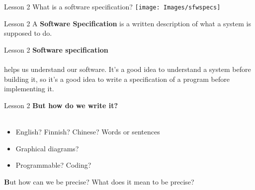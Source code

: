 \documentclass[aspectratio=1610]{beamer}
\begin{document}
\begin{frame}{Lesson 2}{}
\Huge{What is a software specification?}
\texttt{[image: Images/sfwspecs]}
\end{frame}


\begin{frame}{Lesson 2}{}
\Huge
	A \textbf{Software Specification} is a 
	\alert{written} description of what a system is supposed to do.
\end{frame}


\begin{frame}{Lesson 2}{}
\LARGE
\textbf{Software specification}\\~\\
helps us understand our software. It’s a good idea to understand a
system before building it, so it’s a good idea to write a specification of a program
\alert{before} implementing it.
\end{frame}


\begin{frame}{Lesson 2}{}
\LARGE
\textbf{But how do we write it?}\\~\\
\begin{itemize}
    \item English? Finnish? Chinese? Words or sentences
    \item Graphical diagrams?
    \item Programmable? Coding?
\end{itemize}

\Large
\textbf But how can we be precise? What does it mean to be precise?
\end{frame}
\end{document}
